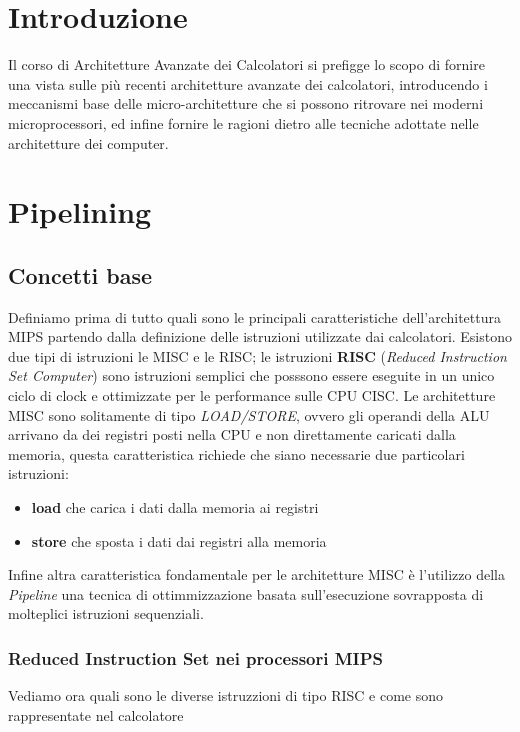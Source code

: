 \label{capitolo1}
\section*{Introduzione}
Il corso di Architetture Avanzate dei Calcolatori si prefigge lo scopo di fornire una vista sulle più recenti architetture avanzate dei calcolatori, introducendo i meccanismi base delle micro-architetture che si possono ritrovare nei moderni microprocessori, ed infine fornire le ragioni dietro alle tecniche adottate nelle architetture dei computer.
\section{Pipelining}
\subsection{Concetti base}
Definiamo prima di tutto quali sono le principali caratteristiche dell'architettura MIPS partendo dalla definizione delle istruzioni utilizzate dai calcolatori.
Esistono due tipi di istruzioni le MISC e le RISC; le istruzioni \textbf{RISC} (\emph{Reduced Instruction Set Computer}) sono istruzioni semplici che posssono essere eseguite in un unico ciclo di clock e ottimizzate per le performance sulle CPU CISC.
Le architetture MISC sono solitamente di tipo \emph{LOAD/STORE}, ovvero gli operandi della ALU arrivano da dei registri posti nella CPU e non direttamente caricati dalla memoria,  questa caratteristica richiede che siano necessarie due particolari istruzioni:
\begin{itemize}
\item \textbf{load} che carica i dati dalla memoria ai registri
\item \textbf{store} che sposta i dati dai registri alla memoria
\end{itemize}
Infine altra caratteristica fondamentale per le architetture MISC è l'utilizzo della \emph{Pipeline} una tecnica di ottimmizzazione basata sull'esecuzione sovrapposta di molteplici istruzioni sequenziali.
\subsubsection{Reduced Instruction Set nei processori MIPS}
Vediamo ora quali sono le diverse istruzzioni di tipo RISC e come sono rappresentate nel calcolatore
